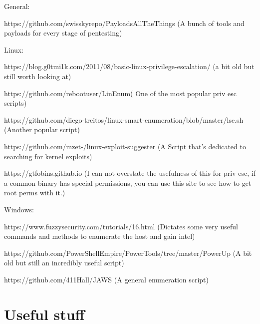 \documentclass[12pt,a4paper]{scrartcl}
\begin{document}
General:

https://github.com/swisskyrepo/PayloadsAllTheThings (A bunch of tools and payloads for every stage of pentesting)


Linux:

https://blog.g0tmi1k.com/2011/08/basic-linux-privilege-escalation/ (a bit old but still worth looking at)

https://github.com/rebootuser/LinEnum( One of the most popular priv esc scripts)

https://github.com/diego-treitos/linux-smart-enumeration/blob/master/lse.sh (Another popular script)

https://github.com/mzet-/linux-exploit-suggester (A Script that's dedicated to searching for kernel exploits)


https://gtfobins.github.io (I can not overstate the usefulness of this for priv esc, if a common binary has special permissions, you can use this site to see how to get root perms with it.)


Windows:


https://www.fuzzysecurity.com/tutorials/16.html  (Dictates some very useful commands and methods to enumerate the host and gain intel)


https://github.com/PowerShellEmpire/PowerTools/tree/master/PowerUp (A bit old but still an incredibly useful script)


https://github.com/411Hall/JAWS (A general enumeration script)

\section{Useful stuff}
\end{document}
